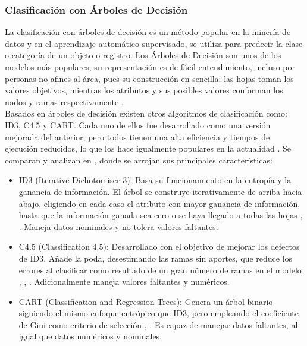 \subsubsection{Clasificación con Árboles de Decisión}
La clasificación con árboles de decisión es un método popular en la minería de datos y en el aprendizaje automático supervisado, se utiliza para predecir la clase o categoría de un objeto o registro. Los Árboles de Decisión son unos de los modelos más populares, su representación es de fácil entendimiento, incluso por personas no afines al área, pues su construcción en sencilla: las hojas toman los valores objetivos, mientras los atributos y sus posibles valores conforman los nodos y ramas respectivamente \citep{sammut2011encyclopedia}. \\
Basados en árboles de decisión existen otros algoritmos de clasificación como: ID3, C4.5 y CART. Cada uno de ellos fue desarrollado como una versión mejorada del anterior, pero todos tienen una alta eficiencia y tiempos de ejecución reducidos, lo que los hace igualmente populares en la actualidad \citep{javed2022performance}. Se comparan y analizan en \citep{gupta2017analysis}, donde se arrojan sus principales características:
\begin{itemize}
	\item ID3 (Iterative Dichotomiser 3): Basa su funcionamiento en la entropía y la ganancia de información. El árbol se construye iterativamente de arriba hacia abajo, eligiendo en cada caso el atributo con mayor ganancia de información, hasta que la información ganada sea cero o se haya llegado a todas las hojas \citep{javed2022performance}, \citep{gupta2017analysis}. Maneja datos nominales y no tolera valores faltantes.
	\item C4.5 (Classification 4.5): Desarrollado con el objetivo de mejorar los defectos de ID3. Añade la poda, desestimando las ramas sin aportes, que reduce los errores al clasificar como resultado de un gran número de ramas en el modelo \citep{sammut2011encyclopedia}, \citep{javed2022performance}, \citep{gupta2017analysis}. Adicionalmente maneja valores faltantes y numéricos. 
	\item CART (Classification and Regression Trees): Genera un árbol binario siguiendo el mismo enfoque entrópico que ID3, pero empleando el coeficiente de Gini como criterio de selección \citep{javed2022performance}, \citep{gupta2017analysis}. Es capaz de manejar datos faltantes, al igual que datos numéricos y nominales.
\end{itemize}

